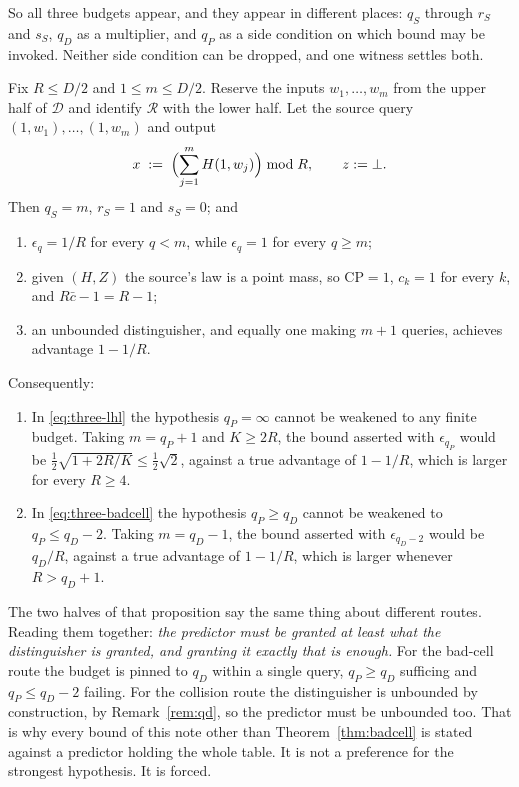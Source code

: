\documentclass{aicr-solution}
\newcommand{\calD}{\mathcal{D}}
\newcommand{\calR}{\mathcal{R}}
\newcommand{\CP}{\mathrm{CP}}
\begin{document}
So all three budgets appear, and they appear in different places: $q_S$ through $r_S$ and $s_S$,
$q_D$ as a multiplier, and $q_P$ as a side condition on which bound may be invoked. Neither side
condition can be dropped, and one witness settles both.
\begin{proposition}\label{prop:qp}
Fix $R \le D/2$ and $1 \le m \le D/2$. Reserve the inputs $w_1,\dots,w_m$ from the upper half of
$\calD$ and identify $\calR$ with the lower half. Let the source query $(1,w_1),\dots,(1,w_m)$ and
output
\[
  x \;:=\; \Bigl(\sum_{j=1}^{m} H(1,w_j)\Bigr) \bmod R , \qquad z := \bot .
\]
Then $q_S = m$, $r_S = 1$ and $s_S = 0$; and
\begin{enumerate}
\item $\epsilon_q = 1/R$ for every $q < m$, while $\epsilon_q = 1$ for every $q \ge m$;
\item given $(H,Z)$ the source's law is a point mass, so $\CP = 1$, $c_k = 1$ for every $k$, and
      $R\bar c - 1 = R-1$;
\item an unbounded distinguisher, and equally one making $m+1$ queries, achieves advantage
      $1 - 1/R$.
\end{enumerate}
Consequently:
\begin{enumerate}
\item[(a)] In \eqref{eq:three-lhl} the hypothesis $q_P = \infty$ cannot be weakened to any finite
      budget. Taking $m = q_P + 1$ and $K \ge 2R$, the bound asserted with $\epsilon_{q_P}$ would be
      $\tfrac12\sqrt{1 + 2R/K} \le \tfrac12\sqrt2$, against a true advantage of $1 - 1/R$, which is
      larger for every $R \ge 4$.
\item[(b)] In \eqref{eq:three-badcell} the hypothesis $q_P \ge q_D$ cannot be weakened to
      $q_P \le q_D - 2$. Taking $m = q_D - 1$, the bound asserted with $\epsilon_{q_D-2}$ would be
      $q_D/R$, against a true advantage of $1 - 1/R$, which is larger whenever $R > q_D + 1$.
\end{enumerate}
\end{proposition}

The two halves of that proposition say the same thing about different routes. Reading them together:
\emph{the predictor must be granted at least what the distinguisher is granted, and granting it
exactly that is enough.} For the bad-cell route the budget is pinned to $q_D$ within a single query,
$q_P \ge q_D$ sufficing and $q_P \le q_D - 2$ failing. For the collision route the distinguisher is
unbounded by construction, by Remark~\ref{rem:qd}, so the predictor must be unbounded too. That is
why every bound of this note other than Theorem~\ref{thm:badcell} is stated against a predictor
holding the whole table. It is not a preference for the strongest hypothesis. It is forced.
\end{document}
